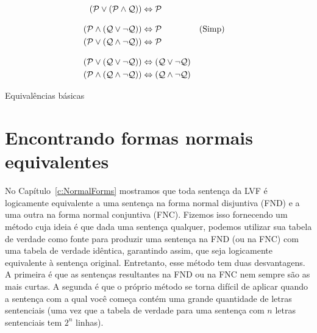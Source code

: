 \begin{table}
{\begin{align*}
(\mathcal{P} \lor (\mathcal{P} \land \mathcal{Q})) & \Leftrightarrow \mathcal{P}\\[2ex]
(\mathcal{P} \land (\mathcal{Q} \lor \lnot\mathcal{Q})) & \Leftrightarrow \mathcal{P}  && \text{(Simp)}\\
(\mathcal{P} \lor (\mathcal{Q} \land \lnot\mathcal{Q})) & \Leftrightarrow \mathcal{P}\\[2ex]
(\mathcal{P} \lor (\mathcal{Q} \lor \lnot\mathcal{Q})) & \Leftrightarrow (\mathcal{Q} \lor \lnot\mathcal{Q}) \\
(\mathcal{P} \land (\mathcal{Q} \land \lnot\mathcal{Q})) & \Leftrightarrow (\mathcal{Q} \land \lnot\mathcal{Q})
\end{align*}  }
\caption{Equivalências básicas}
\label{tab:equivalences}
\end{table}


\FloatBarrier

\section{Encontrando formas normais equivalentes}

No Capítulo~\ref{c:NormalForms} mostramos que toda sentença da LVF é logicamente equivalente a uma sentença na forma normal disjuntiva (FND) e a uma outra na forma normal conjuntiva (FNC). 
Fizemos isso fornecendo um método cuja ideia é que dada uma sentença qualquer, podemos utilizar sua tabela de verdade como fonte para produzir uma sentença na FND (ou na FNC) com uma tabela de verdade idêntica, garantindo assim, que seja logicamente equivalente à sentença original.
Entretanto, esse método tem duas desvantagens. A primeira é que as sentenças resultantes na FND ou na FNC nem sempre são as mais curtas. A segunda é que o próprio método se torna difícil de aplicar quando a sentença com a qual você começa contém uma grande quantidade de letras sentenciais (uma vez que a tabela de verdade para uma sentença com $n$ letras sentenciais tem $2^n$ linhas).


